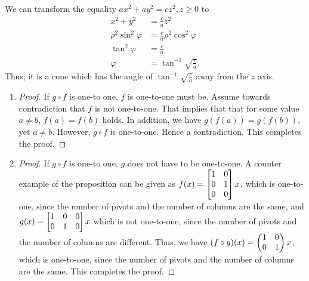 \documentclass[8pt,twocolumn]{article}
\begin{document}
\begin{Answer}[number=24]
  We can transform the equality $ax^2+ay^2=cz^2, z\ge 0$ to
  \begin{align*}
    x^2+y^2&=\frac{c}{a}z^2 \\
    \rho^2 \sin^2\varphi&=\frac{c}{a}\rho^2\cos^2\varphi \\
    \tan^2\varphi&=\frac{c}{a} \\
    \varphi&=\tan^{-1}\sqrt{\frac{c}{a}}.
  \end{align*}
  Thus, it is a cone which has the angle of $\tan^{-1}\sqrt{\frac{c}{a}}$ away
  from the $z$ axis.
\end{Answer}

\begin{Answer}[number=25]
  \begin{enumerate}
    \item \begin{proof}
      If $g\circ f$ is one-to one, $f$ is one-to-one must be. Assume towards
      contradiction that $f$ is not one-to-one. That implies that that for some
      value $a\ne b$, $f(a)=f(b)$ holds. In addition, we have $g(f(a)) =
      g(f(b))$, yet $a\ne b$. However, $g\circ f$ is one-to-one. Hence a
      contradiction. This completes the proof.
    \end{proof}
    \item \begin{proof}
        If $g\circ f$ is one-to one, $g$ does not have to be one-to-one. A
        counter example of the proposition can be given as
        \(f(x) = \begin{bmatrix}
          \imat{2} \\ 0 & 0
        \end{bmatrix}x\), which is one-to-one, since the number of
        pivots and the number of columns are the same, and \(g(x) = \begin{bmatrix}
          \mqty{\imat{2}} & \mqty{0\\0}
        \end{bmatrix}x\) which is not one-to-one, since the number of pivots
        and the number of columns are different. Thus, we have $(f\circ g) (x)
        = \begin{pmatrix}
          \imat{2}
        \end{pmatrix}x$, which is one-to-one, since the number of
        pivots and the number of columns are the same. This completes the
        proof.
    \end{proof}
  \end{enumerate}
\end{Answer}
\end{document}
